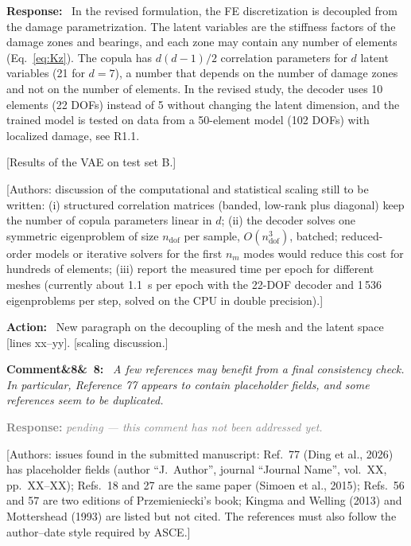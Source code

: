 \documentclass[11pt]{article}
\newenvironment{rcomment}[1]{\par\bigskip\noindent\textbf{Comment\ifx&#1&\else\ #1\fi:}\ \itshape}{\par}
\newenvironment{response}{\par\smallskip\noindent\color{resp}\textbf{Response:}\ }{\par}
\newenvironment{action}{\par\smallskip\noindent\color{resp}\textbf{Action:}\ }{\par}
\newcommand{\pending}{\par\smallskip\noindent\textcolor{gray}{\textbf{Response:} \textit{pending --- this comment
has not been addressed yet.}}\par}
\newcommand{\authornote}[1]{\textcolor{note}{\textsf{[Authors: #1]}}}
\newcommand{\tbd}[1]{\textcolor{note}{\textsf{[#1]}}}
\newcommand{\lines}[1]{\tbd{lines #1}}
\begin{document}
\begin{response}
In the revised formulation, the FE discretization is decoupled from the damage parametrization. The latent variables
are the stiffness factors of the damage zones and bearings, and each zone may contain any number of elements
(Eq.~\eqref{eq:Kz}). The copula has $d(d-1)/2$ correlation parameters for $d$ latent variables (21 for $d=7$), a number
that depends on the number of damage zones and not on the number of elements. In the revised study, the decoder uses 10
elements (22 DOFs) instead of 5 without changing the latent dimension, and the trained model is tested on data from a
50-element model (102 DOFs) with localized damage, see R1.1.

\tbd{Results of the VAE on test set B.}
\end{response}
\authornote{discussion of the computational and statistical scaling still to be written: (i) structured correlation
matrices (banded, low-rank plus diagonal) keep the number of copula parameters linear in $d$; (ii) the decoder solves
one symmetric eigenproblem of size $n_{\mathrm{dof}}$ per sample, $O(n_{\mathrm{dof}}^3)$, batched; reduced-order
models or iterative solvers for the first $n_m$ modes would reduce this cost for hundreds of elements; (iii) report the
measured time per epoch for different meshes (currently about 1.1~s per epoch with the 22-DOF decoder and 1\,536
eigenproblems per step, solved on the CPU in double precision).}

\begin{action}
New paragraph on the decoupling of the mesh and the latent space \lines{xx--yy}. \tbd{scaling discussion.}
\end{action}

\begin{rcomment}{8}
A few references may benefit from a final consistency check. In particular, Reference 77 appears to contain placeholder
fields, and some references seem to be duplicated.
\end{rcomment}
\pending
\authornote{issues found in the submitted manuscript: Ref.~77 (Ding et al., 2026) has placeholder fields (author
``J.~Author'', journal ``Journal Name'', vol.~XX, pp.~XX--XX); Refs.~18 and 27 are the same paper (Simoen et al., 2015);
Refs.~56 and 57 are two editions of Przemieniecki's book; Kingma and Welling (2013) and Mottershead (1993) are listed but
not cited. The references must also follow the author--date style required by ASCE.}
\end{document}
